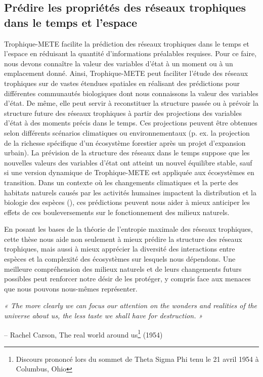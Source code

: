 \subsection{Prédire les propriétés des réseaux trophiques dans le temps et l'espace} 

Trophique-METE facilite la prédiction des réseaux trophiques dans le temps et
l'espace en réduisant la quantité d'informations préalables requises. Pour ce
faire, nous devons connaître la valeur des variables d'état à un moment ou à un
emplacement donné. Ainsi, Trophique-METE peut faciliter l'étude des réseaux
trophiques sur de vastes étendues spatiales en réalisant des prédictions pour
différentes communautés biologiques dont nous connaissons la valeur des
variables d'état. De même, elle peut servir à reconstituer la structure passée
ou à prévoir la structure future des réseaux trophiques à partir des projections
des variables d'état à des moments précis dans le temps. Ces projections peuvent
être obtenues selon différents scénarios climatiques ou environnementaux (p. ex.
la projection de la richesse spécifique d'un écosystème forestier après un
projet d'expansion urbain). La prévision de la structure des réseaux dans le
temps suppose que les nouvelles valeurs des variables d'état ont atteint un
nouvel équilibre stable, sauf si une version dynamique de Trophique-METE est
appliquée aux écosystèmes en transition. Dans un contexte où les changements
climatiques et la perte des habitats naturels causés par les activités humaines
impactent la distribution et la biologie des espèces
(\cite{Walther2002Ecological}), ces prédictions peuvent nous aider à mieux
anticiper les effets de ces bouleversements sur le fonctionnement des milieux
naturels. 

En posant les bases de la théorie de l'entropie maximale des réseaux trophiques,
cette thèse nous aide non seulement à mieux prédire la structure des réseaux
trophiques, mais aussi à mieux apprécier la diversité des interactions entre
espèces et la complexité des écosystèmes sur lesquels nous dépendons. Une
meilleure compréhension des milieux naturels et de leurs changements futurs
possibles peut renforcer notre désir de les protéger, y compris face aux menaces
que nous pouvons nous-mêmes représenter.


\bigskip
\bigskip
\bigskip

\begingroup

\raggedleft

\textit{« The more clearly we can focus our attention on the wonders and
realities of the universe about us, the less taste we shall have for
destruction. »} 
  

– Rachel Carson, The real world around us\footnote{Discours prononcé lors du sommet de Theta Sigma Phi tenu le 21 avril 1954 à Columbus, Ohio} (1954)

\endgroup

\endinput


